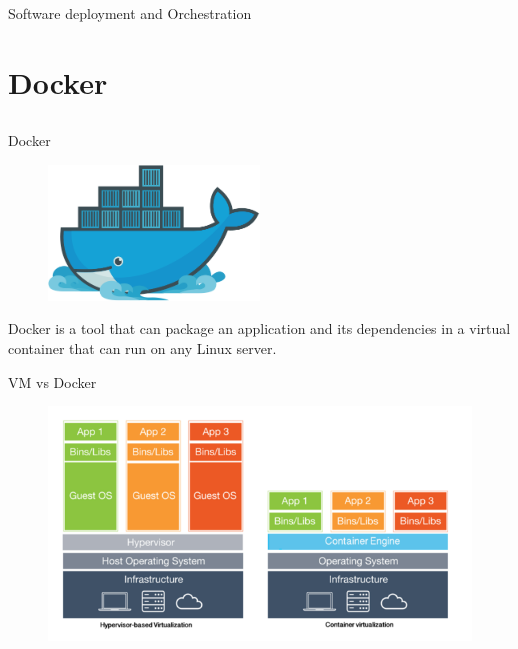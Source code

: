 \documentclass{beamer}
\begin{document}
\begin{frame}{Software deployment and Orchestration}
  \end{frame}


\section{Docker}\subsection*{}

  \begin{frame}{Docker}
    \begin{figure}
      \includegraphics[width=0.5\textwidth]{img/docker.png}
    \end{figure}
    Docker is a tool that can package an application and its dependencies in a virtual container that can run on any Linux server.
  \end{frame}

  \begin{frame}{VM vs Docker}
    \begin{figure}
      \includegraphics[width=1\textwidth]{img/docker_vs_vm.png}
    \end{figure}
  \end{frame}
\end{document}
